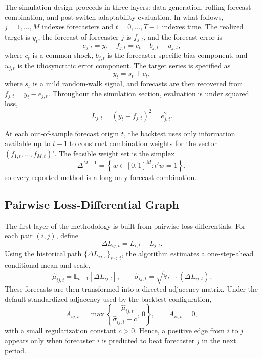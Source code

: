 \documentclass[11pt,a4paper]{article}
\newcommand{\simplex}{\Delta^{M-1}}
\begin{document}
The simulation design proceeds in three layers: data generation, rolling forecast combination, and post-switch adaptability evaluation. In what follows, $j=1,\dots,M$ indexes forecasters and $t=0,\dots,T-1$ indexes time. The realized target is $y_t$, the forecast of forecaster $j$ is $f_{j,t}$, and the forecast error is
\begin{equation}
e_{j,t} = y_t - f_{j,t} = c_t - b_{j,t} - u_{j,t},
\end{equation}
where $c_t$ is a common shock, $b_{j,t}$ is the forecaster-specific bias component, and $u_{j,t}$ is the idiosyncratic error component. The target series is specified as
\begin{equation}
y_t = s_t + c_t,
\end{equation}
where $s_t$ is a mild random-walk signal, and forecasts are then recovered from $f_{j,t}=y_t-e_{j,t}$. Throughout the simulation section, evaluation is under squared loss,
\begin{equation}
L_{j,t} = (y_t - f_{j,t})^2 = e_{j,t}^2.
\end{equation}

At each out-of-sample forecast origin $t$, the backtest uses only information available up to $t-1$ to construct combination weights for the vector $(f_{1,t},\dots,f_{M,t})'$. The feasible weight set is the simplex
\begin{equation}
\simplex = \left\{ w \in [0,1]^M : \iota'w = 1 \right\},
\end{equation}
so every reported method is a long-only forecast combination.

\subsection{Pairwise Loss-Differential Graph}

The first layer of the methodology is built from pairwise loss differentials. For each pair $(i,j)$, define
\begin{equation}
\Delta L_{ij,t} = L_{i,t} - L_{j,t}.
\end{equation}
Using the historical path $\{\Delta L_{ij,s}\}_{s < t}$, the algorithm estimates a one-step-ahead conditional mean and scale,
\begin{equation}
\widehat{\mu}_{ij,t} = \mathbb{E}_{t-1}[\Delta L_{ij,t}],
\qquad
\widehat{\sigma}_{ij,t} = \sqrt{\mathbb{V}_{t-1}(\Delta L_{ij,t})}.
\end{equation}
These forecasts are then transformed into a directed adjacency matrix. Under the default standardized adjacency used by the backtest configuration,
\begin{equation}
A_{ij,t} = \max\left\{ \frac{-\widehat{\mu}_{ij,t}}{\widehat{\sigma}_{ij,t}+c},\,0 \right\},
\qquad A_{ii,t}=0,
\end{equation}
with a small regularization constant $c>0$. Hence, a positive edge from $i$ to $j$ appears only when forecaster $i$ is predicted to beat forecaster $j$ in the next period.
\end{document}

